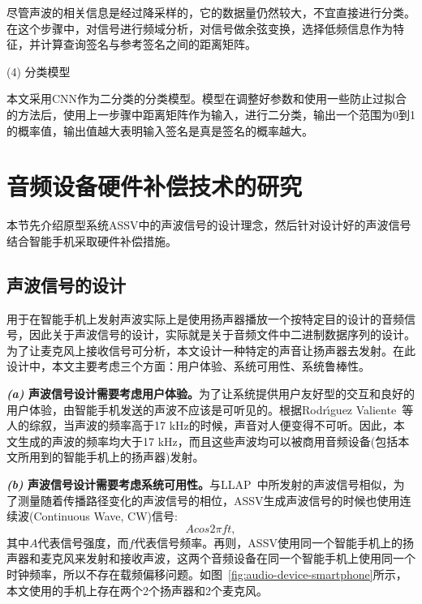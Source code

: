 尽管声波的相关信息是经过降采样的，它的数据量仍然较大，不宜直接进行分类。在这个步骤中，对信号进行频域分析，对信号做余弦变换，选择低频信息作为特征，并计算查询签名与参考签名之间的距离矩阵。

(4) 分类模型

本文采用CNN作为二分类的分类模型。模型在调整好参数和使用一些防止过拟合的方法后，使用上一步骤中距离矩阵作为输入，进行二分类，输出一个范围为0到1的概率值，输出值越大表明输入签名是真是签名的概率越大。

\section{音频设备硬件补偿技术的研究}\label{sec:audio-research}

本节先介绍原型系统ASSV中的声波信号的设计理念，然后针对设计好的声波信号结合智能手机采取硬件补偿措施。

\subsection{声波信号的设计}

用于在智能手机上发射声波实际上是使用扬声器播放一个按特定目的设计的音频信号，因此关于声波信号的设计，实际就是关于音频文件中二进制数据序列的设计。为了让麦克风上接收信号可分析，本文设计一种特定的声音让扬声器去发射。在此设计中，本文主要考虑三个方面：用户体验、系统可用性、系统鲁棒性。

\textbf{\textit{(a)} 声波信号设计需要考虑用户体验。}为了让系统提供用户友好型的交互和良好的用户体验，由智能手机发送的声波不应该是可听见的。根据Rodr{\'\i}guez Valiente~\cite{rodriguez2014extended}等人的综叙，当声波的频率高于17 kHz的时候，声音对人便变得不可听。因此，本文生成的声波的频率均大于17 kHz，而且这些声波均可以被商用音频设备(包括本文所用到的智能手机上的扬声器)发射。

\textbf{\textit{(b)} 声波信号设计需要考虑系统可用性。}与LLAP~\cite{wang2016device}中所发射的声波信号相似，为了测量随着传播路径变化的声波信号的相位，ASSV生成声波信号的时候也使用连续波(Continuous Wave, CW)信号:
$$
Acos2\pi ft, 
$$
其中$A$代表信号强度，而$f$代表信号频率。再则，ASSV使用同一个智能手机上的扬声器和麦克风来发射和接收声波，这两个音频设备在同一个智能手机上使用同一个时钟频率，所以不存在载频偏移问题。如图~\ref{fig:audio-device-smartphone}所示，本文使用的手机上存在两个2个扬声器和2个麦克风。

